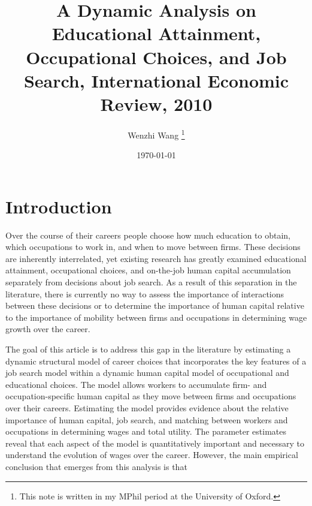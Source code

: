 \documentclass[12pt]{article}
\newcommand{\highlightP}[1]{{\emph{\color{MyPink}{#1}}}}
\theoremstyle{definition}
\begin{document}

\title{\bf A Dynamic Analysis on Educational Attainment, Occupational Choices, and Job Search, International Economic Review, 2010}
\author{Wenzhi Wang \thanks{This note is written in my MPhil period at the University of Oxford.} } 
\date{\today}
\maketitle

\citet{sullivanDynamicAnalysisEducational2010}


\section{Introduction}

Over the course of their careers people choose how much education to obtain, which occupations to work in, and when to move between firms. These decisions are inherently interrelated, yet existing research has greatly examined educational attainment, occupational choices, and on-the-job human capital accumulation separately from decisions about job search. As a result of this separation in the literature, there is currently no way to assess the importance of interactions between these decisions or to determine the importance of human capital relative to the importance of mobility between firms and occupations in determining wage growth over the career. 

The goal of this article is to address this gap in the literature by estimating a dynamic structural model of career choices that incorporates the key features of a job search model within a dynamic human capital model of occupational and educational choices. The model allows workers to accumulate firm- and occupation-specific human capital as they move between firms and occupations over their careers. Estimating the model provides evidence about the relative importance of human capital, job search, and matching between workers and occupations in determining wages and total utility. The parameter estimates reveal that each aspect of the model is quantitatively important and necessary to understand the evolution of wages over the career. However, the main empirical conclusion that emerges from this analysis is that \highlightP{self selection in occupational choices and mobility between firms are much more important determinants of total earnings and utility than the combined effects of firm- and occupation-specific human capital.}
\end{document}
